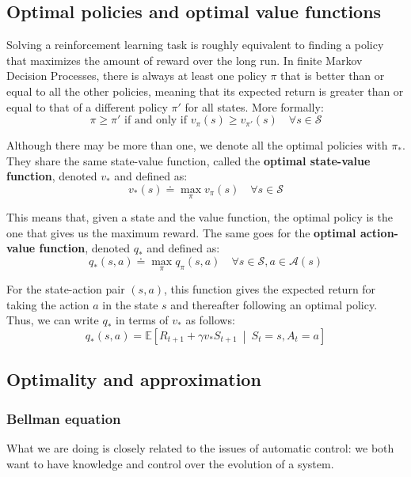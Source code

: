 \subsection{Optimal policies and optimal value functions}
Solving a reinforcement learning task is roughly equivalent to finding a policy that maximizes the amount of reward over the long run. In finite Markov Decision Processes, there is always at least one policy $\pi$ that is better than or equal to all the other policies, meaning that its expected return is greater than or equal to that of a different policy $\pi'$ for all states. More formally:
\begin{equation*}
    \pi \ge \pi' \text{ if and only if } v_\pi(s) \ge v_{\pi'} (s) \quad \forall s \in \mathcal{S}
\end{equation*}

Although there may be more than one, we denote all the optimal policies with $\pi_*$. They share the same state-value function, called the \textbf{optimal state-value function}, denoted $v_*$ and defined as:
\begin{equation}
    v_*(s) \doteq \max_\pi v_\pi(s) \quad \forall s \in \mathcal{S}
    \label{eq:ch2-optimalstatevaluefunction}
\end{equation}

This means that, given a state and the value function, the optimal policy is the one that gives us the maximum reward. The same goes for the \textbf{optimal action-value function}, denoted $q_*$ and defined as:
\begin{equation}
    q_*(s,a) \doteq \max_\pi q_\pi(s,a) \quad \forall s \in \mathcal{S}, a \in \mathcal{A}(s)
    \label{eq:ch2-optimalactionvaluefunction}
\end{equation}

For the state-action pair $(s,a)$, this function gives the expected return for taking the action $a$ in the state $s$ and thereafter following an optimal policy. Thus, we can write $q_*$ in terms of $v_*$ as follows:
\begin{equation*}
    q_*(s,a) = \mathbb{E} \left[ R_{t+1} + \gamma v_* S_{t+1} \  \middle\vert \ S_t = s, A_t = a \right]
\end{equation*}

\subsection{Optimality and approximation}
\subsubsection{Bellman equation}
What we are doing is closely related to the issues of automatic control: we both want to have knowledge and control over the evolution of a system.

